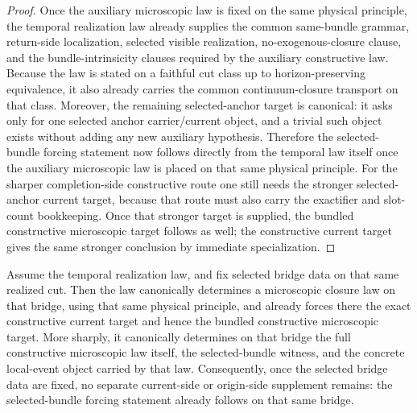 \begin{proof}
Once the auxiliary microscopic law is fixed on the same physical principle, the
temporal realization law already supplies the common same-bundle grammar,
return-side localization, selected visible realization, no-exogenous-closure
clause, and the bundle-intrinsicity clauses required by the auxiliary
constructive law. Because the law is stated on a faithful cut class up to
horizon-preserving equivalence, it also already carries the common
continuum-closure transport on that class. Moreover, the remaining
selected-anchor target is canonical: it asks only for one selected
anchor carrier/current object, and a trivial such object exists
without adding any new auxiliary hypothesis. Therefore the selected-bundle
forcing statement now follows directly from the temporal law itself once the
auxiliary microscopic law is placed on that same physical
principle. For the sharper completion-side constructive route one still needs
the stronger selected-anchor current target, because that route must also
carry the exactifier and slot-count bookkeeping. Once that stronger target is
supplied, the bundled constructive microscopic target follows as well; the
constructive current target gives the same stronger conclusion by immediate
specialization.
\end{proof}

\begin{theorem}
\label{thm:temporal-law-closes-current-side-microscopic-seam-on-a-fixed-bridge}
Assume the temporal realization law, and fix selected bridge data
on that same realized cut. Then the law canonically determines a microscopic
closure law on that bridge, using that same physical principle, and already
forces there the exact constructive current target and hence the bundled
constructive microscopic target. More sharply, it canonically determines on
that bridge the full constructive microscopic law itself, the
selected-bundle witness, and the concrete local-event object carried
by that law. Consequently, once the selected bridge data are fixed, no
separate current-side or origin-side supplement remains: the selected-bundle
forcing statement already follows on that same bridge.
\end{theorem}

